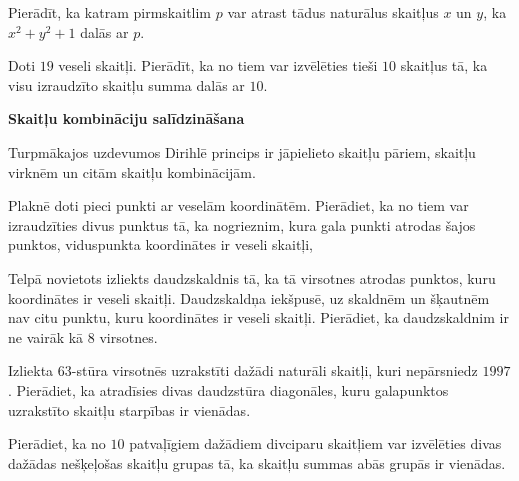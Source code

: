 \documentclass[a4paper,12pt]{article}
\begin{document}
\vspace{10pt}
\begin{problem}
Pierādīt, ka katram pirmskaitlim $p$ var atrast tādus 
naturālus skaitļus $x$ un $y$, ka $x^2 + y^2 + 1$ dalās ar $p$.
\end{problem}


\vspace{10pt}
\begin{problem}
Doti $19$ veseli skaitļi. Pierādīt, ka no tiem var 
izvēlēties tieši $10$ skaitļus tā, ka visu izraudzīto 
skaitļu summa dalās ar $10$.
\end{problem}

 
 
\vspace{20pt}
{\bf Skaitļu kombināciju salīdzināšana}

\vspace{10pt}
Turpmākajos uzdevumos Dirihlē princips ir jāpielieto 
skaitļu pāriem, skaitļu virknēm un citām skaitļu kombinācijām.


\vspace{10pt}
\begin{problem}
Plaknē doti pieci punkti ar veselām koordinātēm. Pierādiet, 
ka no tiem var izraudzīties divus punktus tā, ka nogrieznim, 
kura gala punkti atrodas šajos punktos, viduspunkta 
koordinātes ir veseli skaitļi,
\end{problem}




\vspace{10pt}
\begin{problem}
Telpā novietots izliekts daudzskaldnis tā, ka tā virsotnes 
atrodas punktos, kuru koordinātes ir veseli skaitļi. 
Daudzskaldņa iekšpusē, uz skaldnēm un šķautnēm nav citu punktu, 
kuru koordinātes ir veseli skaitļi. Pierādiet, ka daudzskaldnim 
ir ne vairāk kā $8$ virsotnes.
\end{problem}



\vspace{10pt}
\begin{problem}
Izliekta $63$-stūra virsotnēs uzrakstīti dažādi naturāli skaitļi, 
kuri nepārsniedz $1997$. Pierādiet, ka atradīsies divas 
daudzstūra diagonāles, kuru galapunktos uzrakstīto skaitļu 
starpības ir vienādas.
\end{problem}



\vspace{10pt}
\begin{problem}
Pierādiet, ka no $10$ patvaļīgiem dažādiem divciparu skaitļiem 
var izvēlēties divas dažādas nešķeļošas skaitļu grupas tā, 
ka skaitļu summas abās grupās ir vienādas.
\end{problem}
\end{document}
